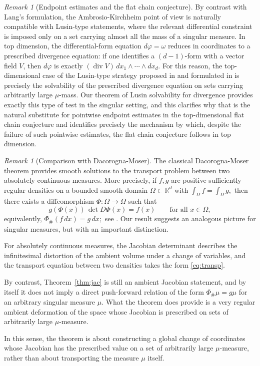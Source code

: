 \documentclass[11pt,a4paper]{article}
\newcommand{\R}{\mathbb{R}}
\newcommand{\diver}{\operatorname{div}}
\theoremstyle{definition}
\theoremstyle{remark}
\newtheorem{rem}[thm]{Remark}
\begin{document}
\begin{rem}[Endpoint estimates and the flat chain conjecture]
By contrast with Lang's formulation, the Ambrosio-Kirchheim point of view is naturally compatible with Lusin-type statements, where the relevant differential constraint is imposed only on a set carrying almost all the mass of a singular measure.
In top dimension, the differential-form equation
$d\varphi=\omega$ reduces in coordinates to a prescribed divergence equation: if one identifies a $(d-1)$-form with a vector field $V$, then $d\varphi$ is exactly $(\diver V)\,dx_1\wedge\cdots\wedge dx_d$.
For this reason, the top-dimensional case of the Lusin-type strategy proposed in \cite[Remark~4.1]{MM} and formulated in \cite[Conjecture~4.1 and Section~4]{DMM} is precisely the solvability of the prescribed divergence equation on sets carrying arbitrarily large $\mu$-mass.
Our theorem of Lusin solvability for divergence provides exactly this type of test in the singular setting, and this clarifies why that is the natural substitute for pointwise endpoint estimates in the top-dimensional flat chain conjecture and identifies precisely the mechanism by which, despite the failure of such pointwise estimates, the flat chain conjecture follows in top dimension.
\end{rem}

\begin{rem}[Comparison with Dacorogna-Moser]

The classical Dacorogna-Moser theorem provides smooth solutions to the transport problem between two absolutely continuous measures.
More precisely, if $f,g$ are positive sufficiently regular densities on a bounded smooth domain $\Omega\subset\R^d$ with
$\int_\Omega f=\int_\Omega g,$
then there exists a diffeomorphism $\Phi:\Omega\to\Omega$ such that
\begin{equation}\label{eq:transp}
g(\Phi(x))\,\det D\Phi(x)=f(x)
\qquad\text{for all }x\in\Omega,    
\end{equation}
equivalently,
$\Phi_\#(f\,dx)=g\,dx;$
see \cite{DM90}.
Our result suggests an analogous picture for singular measures, but with an important distinction.

For absolutely continuous measures, the Jacobian determinant describes the infinitesimal distortion of the ambient volume under a change of variables, and the transport equation between two densities takes the form \eqref{eq:transp}.

By contrast, Theorem~\ref{thm:jac} is still an ambient Jacobian statement, and by itself it does not imply a direct push-forward relation of the form
$\Phi_\#\mu = g\mu$
for an arbitrary singular measure $\mu$.
What the theorem does provide is a very regular ambient deformation of the space whose Jacobian is prescribed on sets of arbitrarily large $\mu$-measure.

In this sense, the theorem is about constructing a global change of coordinates whose Jacobian has the prescribed value on a set of arbitrarily large $\mu$-measure, rather than about transporting the measure $\mu$ itself.
\end{rem}
\end{document}
